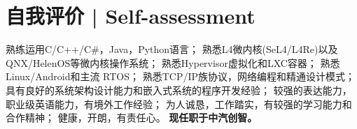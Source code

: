 \documentclass{resume}
\begin{document}





 
\section{自我评价 | Self-assessment}
熟练运用C/C++/C\#，Java，Python语言；\newline
熟悉L4微内核(SeL4/L4Re)以及QNX/HelenOS等微内核操作系统；\newline
熟悉Hypervisor虚拟化和LXC容器；\newline
熟悉Linux/Android和主流 RTOS；\newline
熟悉TCP/IP族协议，网络编程和精通设计模式；\newline
具有良好的系统架构设计能力和嵌入式系统的程序开发经验；\newline
较强的表达能力，职业级英语能力，有境外工作经验；\newline
为人诚恳，工作踏实，有较强的学习能力和合作精神；\newline
健康，开朗，有责任心。\newline
\textbf{现任职于中汽创智。}
\spaceline{}

\end{document}
